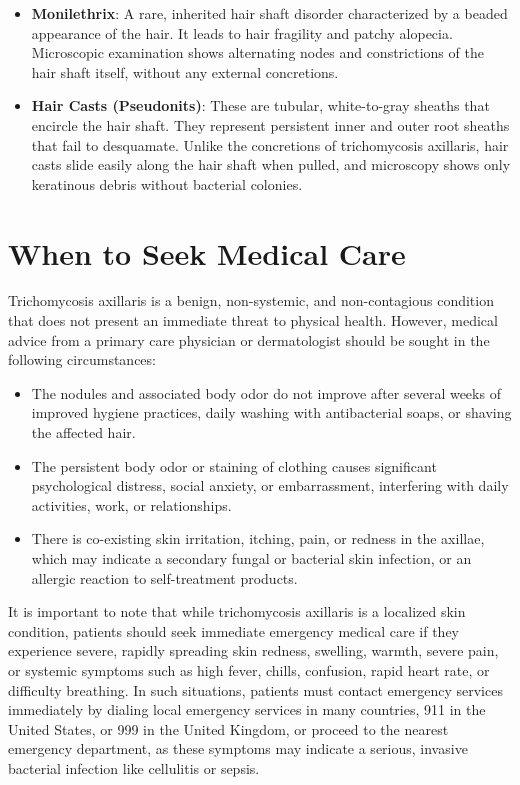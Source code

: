 \begin{itemize}
    \item \textbf{Monilethrix}: A rare, inherited hair shaft disorder characterized by a beaded appearance of the hair. It leads to hair fragility and patchy alopecia. Microscopic examination shows alternating nodes and constrictions of the hair shaft itself, without any external concretions.
    \item \textbf{Hair Casts (Pseudonits)}: These are tubular, white-to-gray sheaths that encircle the hair shaft. They represent persistent inner and outer root sheaths that fail to desquamate. Unlike the concretions of trichomycosis axillaris, hair casts slide easily along the hair shaft when pulled, and microscopy shows only keratinous debris without bacterial colonies.
\end{itemize}

\section*{When to Seek Medical Care}
Trichomycosis axillaris is a benign, non-systemic, and non-contagious condition that does not present an immediate threat to physical health. However, medical advice from a primary care physician or dermatologist should be sought in the following circumstances:
\begin{itemize}
    \item The nodules and associated body odor do not improve after several weeks of improved hygiene practices, daily washing with antibacterial soaps, or shaving the affected hair.
    \item The persistent body odor or staining of clothing causes significant psychological distress, social anxiety, or embarrassment, interfering with daily activities, work, or relationships.
    \item There is co-existing skin irritation, itching, pain, or redness in the axillae, which may indicate a secondary fungal or bacterial skin infection, or an allergic reaction to self-treatment products.
\end{itemize}
It is important to note that while trichomycosis axillaris is a localized skin condition, patients should seek immediate emergency medical care if they experience severe, rapidly spreading skin redness, swelling, warmth, severe pain, or systemic symptoms such as high fever, chills, confusion, rapid heart rate, or difficulty breathing. In such situations, patients must contact emergency services immediately by dialing local emergency services in many countries, 911 in the United States, or 999 in the United Kingdom, or proceed to the nearest emergency department, as these symptoms may indicate a serious, invasive bacterial infection like cellulitis or sepsis.

